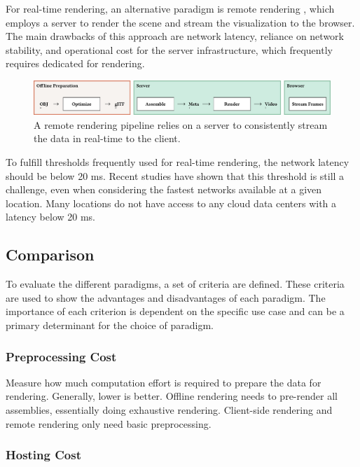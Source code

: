 For real-time rendering, an alternative paradigm is remote rendering \cite{remoteRendering}, which employs a server to render the scene and stream the visualization to the browser. The main drawbacks of this approach are network latency, reliance on network stability, and operational cost for the server infrastructure, which frequently requires dedicated  for rendering.

\begin{figure}[H]
  \includegraphics[width=\columnwidth]{resources/cad-pipeline-remote.png}
  \caption{A remote rendering pipeline relies on a server to consistently stream the data in real-time to the client.}
  \label{fig:cad-remote}
\end{figure}

To fulfill thresholds frequently used for real-time rendering, the network latency should be below 20 ms. Recent studies have shown that this threshold is still a challenge, even when considering the fastest networks available at a given location. Many locations do not have access to any cloud data centers with a latency below 20 ms. \cite{cloudLatency}

\subsection*{Comparison}

To evaluate the different paradigms, a set of criteria are defined. These criteria are used to show the advantages and disadvantages of each paradigm. The importance of each criterion is dependent on the specific use case and can be a primary determinant for the choice of paradigm.

\subsubsection{Preprocessing Cost}

Measure how much computation effort is required to prepare the data for rendering. Generally, lower is better. Offline rendering needs to pre-render all assemblies, essentially doing exhaustive rendering. Client-side rendering and remote rendering only need basic preprocessing.

\subsubsection{Hosting Cost}

